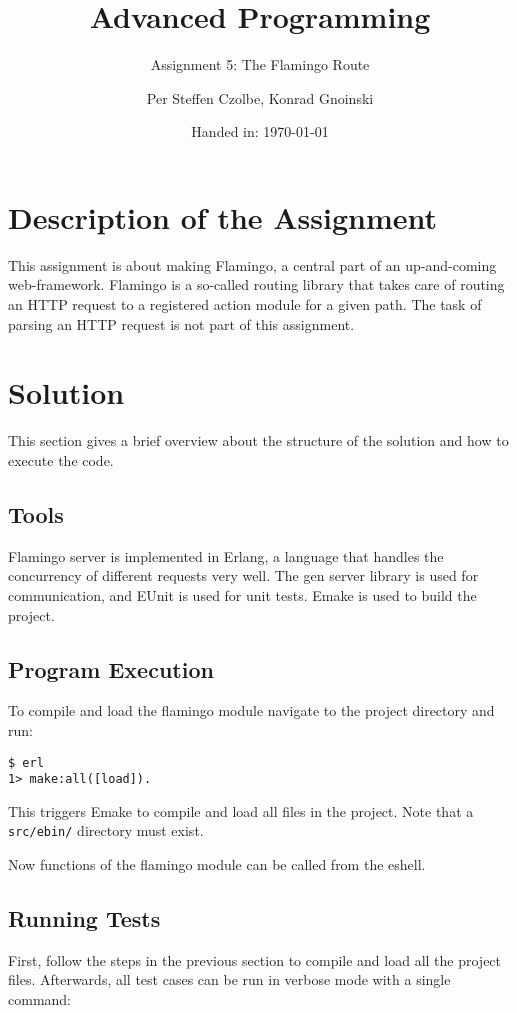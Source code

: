 \documentclass[11pt, a4paper]{article}
\author{Per Steffen Czolbe, Konrad Gnoinski}
\title{Advanced Programming}
\subtitle{Assignment 5: The Flamingo Route} %
\date{Handed in: \today}
\begin{document}
\maketitle

\tableofcontents


\section{Description of the Assignment}
This assignment is about making Flamingo, a central part of an up-and-coming web-framework. Flamingo is a so-called routing library that takes care of routing an HTTP request to a registered action module for a given path. The task of parsing an HTTP request is not part of this assignment.

\section{Solution}
This section gives a brief overview about the structure of the solution and how to execute the code.

\subsection{Tools}
Flamingo server is implemented in Erlang, a language that handles the concurrency of different requests very well. The gen server library is used for communication, and EUnit is used for unit tests. Emake is used to build the project.

\subsection{Program Execution}
To compile and load the flamingo module navigate to the project directory and run:

\begin{verbatim}
$ erl
1> make:all([load]).
\end{verbatim}

This triggers Emake to compile and load all files in the project. Note that a \texttt{src/ebin/} directory must exist.

Now functions of the flamingo module can be called from the eshell.


\subsection{Running Tests}
First, follow the steps in the previous section to compile and load all the project files. Afterwards, all test cases can be run in verbose mode with a single command:
\end{document}
